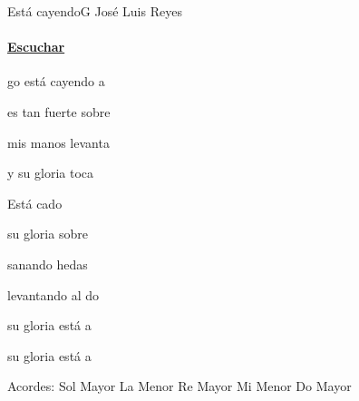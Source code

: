 \documentclass[12pt, spanish]{book}
\newcommand{\NotCCLIed}{\relax}
\begin{document}
    \begin{song}{Está cayendo}{G}
    {} %
    {José Luis Reyes}
    {} %
    {} %
        \ifChordBk
        \paragraph{\mbox{}\hfill\protect\href{https://open.spotify.com/intl-es/track/6XXn8f7bPRT2hP4j5nYbcJ}{Escuchar}\mbox{}\hfill}
        \fi



        \begin{SBOpGroup}
            go está cayendo a

            es tan fuerte sobre 

            mis manos levanta

            y su gloria toca
        \end{SBOpGroup}

        \begin{SBChorus}
            Está cado

            su gloria sobre 

            sanando hedas

            levantando al do

            su gloria está a

            su gloria está a
        \end{SBChorus}


        \ifChordBk
        \begin{SBOpGroup}
            Acordes:
            \upchord{\G}\qquad Sol Mayor \hfill
            \upchord{\Am}\qquad La Menor \hfill\null\break
            \upchord{\D}\qquad Re Mayor \hfill
            \upchord{\Em}\qquad Mi Menor \hfill
            \upchord{\C}\qquad Do Mayor \hfill\null\break
        \end{SBOpGroup}
        \fi
    \end{song}
\end{document}
